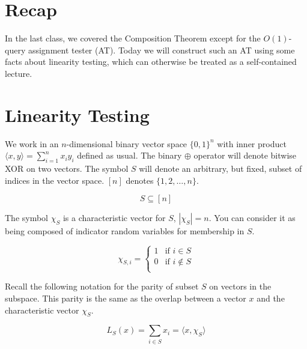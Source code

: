 \documentclass[12pt]{article}
\begin{document}
\MakeScribeTop

\def\Var{{\rm Var}\,}
\def\qopnamewl@#1{\mathop{\fam\z@#1}\nlimits@}
\def\Exp{\mathop{\rm {E}}}
\def\dist{{\rm dist}\,}
\section{Recap}

In the last class, we covered the Composition Theorem except for the
$O(1)$-query assignment tester (AT). Today we will construct such an
AT using some facts about linearity testing, which can otherwise be
treated as a self-contained lecture.

\section{Linearity Testing}

We work in an $n$-dimensional binary vector space $\{0,1\}^n$ with
inner product $\langle x,y \rangle = \sum_{i=1}^{n}{x_i y_i}$ defined as usual.
The binary $\oplus$ operator will denote bitwise XOR on two vectors.
The symbol $S$ will denote an arbitrary, but fixed, subset of indices in
the vector space. $[n]$ denotes $\{1,2,\ldots,n\}$.

\begin{displaymath}
S \subseteq [n]
\end{displaymath}

The symbol $\chi_S$ is a characteristic vector for $S$, $|\chi_S| = n$.
You can consider
it as being composed of indicator random variables for membership in $S$.

\begin{displaymath}
\chi_{S,i} = \left\{ \begin{array}{ll}
1 & \textrm{if } i \in S\\
0 & \textrm{if } i \notin S\\
\end{array} \right.
\end{displaymath}

Recall the following notation for the parity of subset $S$ on vectors in the
subspace. This parity is the same as the overlap
between a vector $x$ and the characteristic vector
$\chi_S$.

\begin{displaymath}
L_S(x) = \sum_{i \in S} x_i = \langle x, \chi_S \rangle
\end{displaymath}
\end{document}
